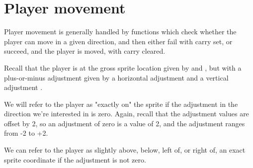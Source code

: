 \documentclass[10pt]{report}%
\begin{document}
\eatline
{}\nwendcode{}\nwdocspar
\section{Player movement}

Player movement is generally handled by functions which check whether the player can
move in a given direction, and then either fail with carry set, or succeed, and the
player is moved, with carry cleared.

Recall that the player is at
the gross sprite location given by {\Tt{}\nwendquote} and {\Tt{}\nwendquote}, but with a plus-or-minus
adjustment given by a horizontal adjustment {\Tt{}\nwendquote} and a vertical adjustment {\Tt{}\nwendquote}.

We will refer to the player as
"exactly on" the sprite if the adjustment in the direction we're interested in is zero.
Again, recall that the adjustment values are offset by {\Tt{}2\nwendquote}, so an adjustment of zero is a value
of {\Tt{}2\nwendquote}, and the adjustment ranges from {\Tt{}-2\nwendquote} to {\Tt{}+2\nwendquote}.

We can refer to the player as slightly above, below, left of, or right of, an exact
sprite coordinate if the adjustment is not zero.
\end{document}
